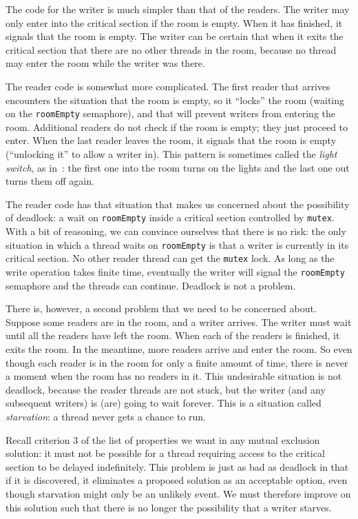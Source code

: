 The code for the writer is much simpler than that of the readers. The writer may only enter into the critical section if the room is empty. When it has finished, it signals that the room is empty. The writer can be certain that when it exits the critical section that there are no other threads in the room, because no thread may enter the room while the writer was there.

The reader code is somewhat more complicated. The first reader that arrives encounters the situation that the room is empty, so it ``locks'' the room (waiting on the \texttt{roomEmpty} semaphore), and that will prevent writers from entering the room. Additional readers do not check if the room is empty; they just proceed to enter. When the last reader leaves the room, it signals that the room is empty (``unlocking it'' to allow a writer in). This pattern is sometimes called the \textit{light switch}, as in~\cite{mte241}: the first one into the room turns on the lights and the last one out turns them off again. 

The reader code has that situation that makes us concerned about the possibility of deadlock: a wait on \texttt{roomEmpty} inside a critical section controlled by \texttt{mutex}. With a bit of reasoning, we can convince ourselves that there is no risk: the only situation in which a thread waits on \texttt{roomEmpty} is that a writer is currently in its critical section. No other reader thread can get the \texttt{mutex} lock. As long as the write operation takes finite time, eventually the writer will signal the \texttt{roomEmpty} semaphore and the threads can continue. Deadlock is not a problem.

There is, however, a second problem that we need to be concerned about. Suppose some readers are in the room, and a writer arrives. The writer must wait until all the readers have left the room. When each of the readers is finished, it exits the room. In the meantime, more readers arrive and enter the room. So even though each reader is in the room for only a finite amount of time, there is never a moment when the room has no readers in it. This undesirable situation is not deadlock, because the reader threads are not stuck, but the writer (and any subsequent writers) is (are) going to wait forever. This is a situation called \textit{starvation}: a thread never gets a chance to run.

Recall criterion 3 of the list of properties we want in any mutual exclusion solution: it must not be possible for a thread requiring access to the critical section to be delayed indefinitely. This problem is just as bad as deadlock in that if it is discovered, it eliminates a proposed solution as an acceptable option, even though starvation might only be an unlikely event. We must therefore improve on this solution such that there is no longer the possibility that a writer starves.

